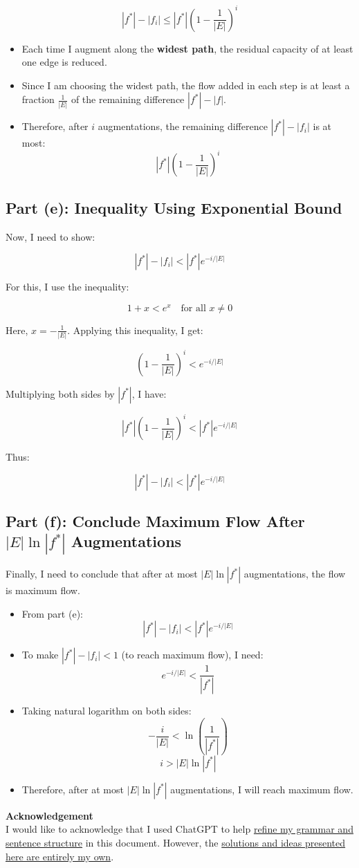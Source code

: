 \documentclass[10pt,letter,notitlepage]{article}
\begin{document}
\begin{Answer}
\[
|f^*| - |f_i| \leq |f^*| \left( 1 - \frac{1}{|E|} \right)^i
\]

\begin{itemize}
    \item Each time I augment along the \textbf{widest path}, the residual capacity of at least one edge is reduced.
    \item Since I am choosing the widest path, the flow added in each step is at least a fraction $\frac{1}{|E|}$ of the remaining difference $|f^*| - |f|$.
    \item Therefore, after $i$ augmentations, the remaining difference $|f^*| - |f_i|$ is at most:
    \[
    |f^*| \left( 1 - \frac{1}{|E|} \right)^i
    \]
\end{itemize}

\subsection*{Part (e): Inequality Using Exponential Bound}
Now, I need to show:

\[
|f^*| - |f_i| < |f^*| e^{-i/|E|}
\]

For this, I use the inequality:

\[
1 + x < e^x \quad \text{for all } x \neq 0
\]

Here, $x = -\frac{1}{|E|}$. Applying this inequality, I get:

\[
\left( 1 - \frac{1}{|E|} \right)^i < e^{-i/|E|}
\]

Multiplying both sides by $|f^*|$, I have:

\[
|f^*| \left( 1 - \frac{1}{|E|} \right)^i < |f^*| e^{-i/|E|}
\]

Thus:

\[
|f^*| - |f_i| < |f^*| e^{-i/|E|}
\]

\subsection*{Part (f): Conclude Maximum Flow After $|E| \ln |f^*|$ Augmentations}
Finally, I need to conclude that after at most $|E| \ln |f^*|$ augmentations, the flow is maximum flow.

\begin{itemize}
    \item From part (e):
    \[
    |f^*| - |f_i| < |f^*| e^{-i/|E|}
    \]
    \item To make $|f^*| - |f_i| < 1$ (to reach maximum flow), I need:
    \[
    e^{-i/|E|} < \frac{1}{|f^*|}
    \]
    \item Taking natural logarithm on both sides:
    \[
    -\frac{i}{|E|} < \ln\left(\frac{1}{|f^*|}\right)
    \]
    \[
    i > |E| \ln |f^*|
    \]
    \item Therefore, after at most $|E| \ln |f^*|$ augmentations, I will reach maximum flow.
\end{itemize}


\end{Answer}

\vspace{+0.5cm}

\par \textbf{Acknowledgement}\\

I would like to acknowledge that I used ChatGPT to help \underline{refine my grammar and sentence structure} in this document. However, the \underline{solutions and ideas presented here are entirely my own}. 
\end{document}

